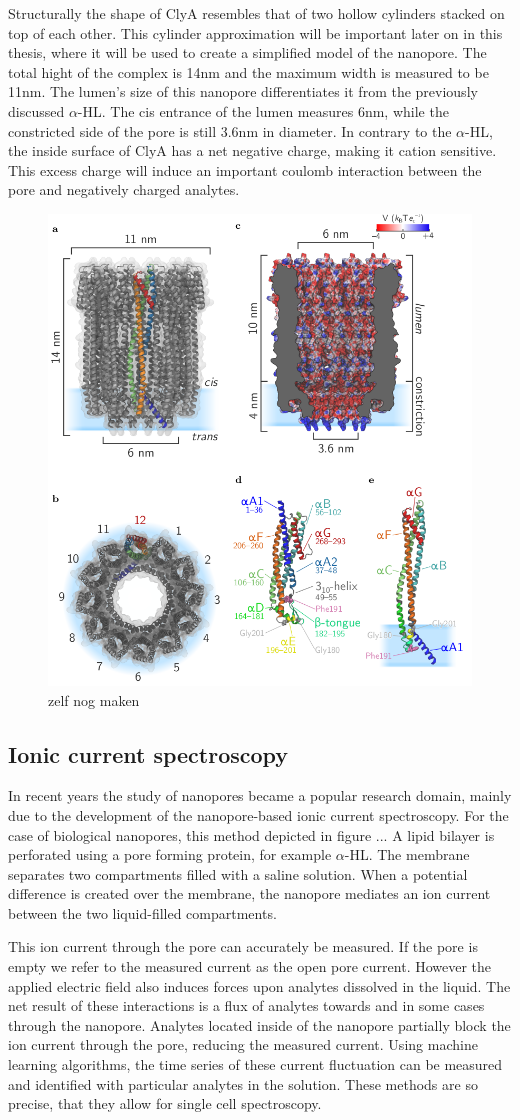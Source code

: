 Structurally the shape of ClyA resembles that of two hollow cylinders stacked on top of
each other. This cylinder approximation will be important later on in this thesis, where
it will be used to create a simplified model of the nanopore. The total hight of the
complex is
14nm and the maximum width is measured to be 11nm. The lumen's size of this nanopore
differentiates it from the previously discussed $\alpha$-HL. The cis entrance of the
lumen measures 6nm, while the constricted side of the pore is still 3.6nm in diameter. In
contrary to the $\alpha$-HL, the inside surface of ClyA has a net negative charge,
making it cation sensitive. This excess charge will induce an important
 coulomb interaction between the pore and negatively charged analytes.


\begin{figure}[h!]
  \centering
  \includegraphics[width=0.5\linewidth]{Figures/cytolysinA.png}
  \caption{zelf nog maken}
  \label{adassf}
\end{figure}

\subsection{Ionic current spectroscopy}
In recent years the study of nanopores became a popular research domain, mainly
due to the development of the nanopore-based ionic current spectroscopy. For the case of
biological nanopores, this method depicted in figure ... A lipid bilayer is perforated
using a pore forming protein, for example $\alpha$-HL. The membrane separates two
compartments filled with a saline solution. When a potential difference is created
over the membrane, the nanopore mediates an ion current between the two liquid-filled
compartments.

This ion current through the pore can accurately be measured. If the pore is empty we
refer to the measured current as the open pore current.  However the applied electric
field also induces forces upon analytes dissolved in the liquid. The net result of these
interactions is a flux of analytes towards and in some cases through the nanopore.
Analytes located inside of the nanopore partially block the ion current through the pore,
reducing the measured current. Using machine learning algorithms, the time series of
these current fluctuation can be measured and identified with particular analytes in the
solution. These methods are so precise, that they allow for single cell spectroscopy.

